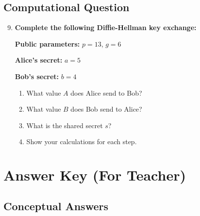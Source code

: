 \documentclass[11pt]{article}
\begin{document}
\subsection*{Computational Question}

\begin{enumerate}[label=\textbf{\arabic*.}]
    \setcounter{enumi}{8}
    
    \item \textbf{Complete the following Diffie-Hellman key exchange:}
    
    \textbf{Public parameters:} $p = 13$, $g = 6$
    
    \textbf{Alice's secret:} $a = 5$
    
    \textbf{Bob's secret:} $b = 4$
    
    \begin{enumerate}[label=\alph*)]
        \item What value $A$ does Alice send to Bob?
        \item What value $B$ does Bob send to Alice?
        \item What is the shared secret $s$?
        \item Show your calculations for each step.
    \end{enumerate}
\end{enumerate}

\section*{Answer Key (For Teacher)}

\subsection*{Conceptual Answers}
\end{document}
